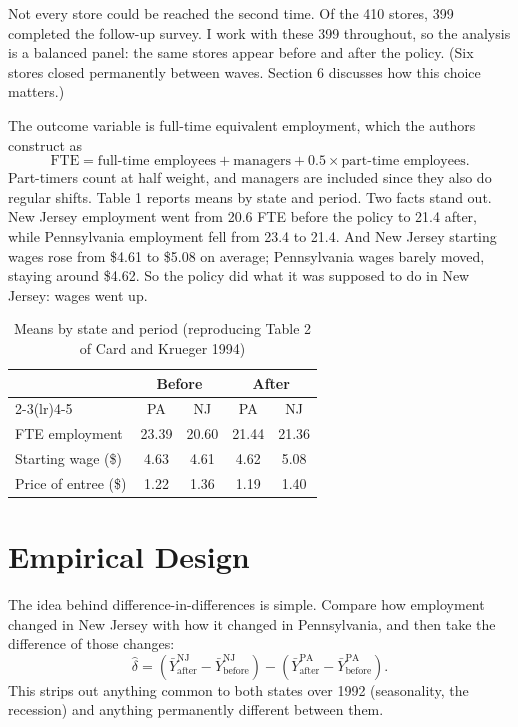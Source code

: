 \documentclass[11pt]{article}
\begin{document}
Not every store could be reached the second time. Of the 410 stores, 399 completed the follow-up survey. I work with these 399 throughout, so the analysis is a balanced panel: the same stores appear before and after the policy. (Six stores closed permanently between waves. Section 6 discusses how this choice matters.)

The outcome variable is full-time equivalent employment, which the authors construct as
\[
\text{FTE} = \text{full-time employees} + \text{managers} + 0.5 \times \text{part-time employees}.
\]
Part-timers count at half weight, and managers are included since they also do regular shifts. Table 1 reports means by state and period. Two facts stand out. New Jersey employment went from 20.6 FTE before the policy to 21.4 after, while Pennsylvania employment fell from 23.4 to 21.4. And New Jersey starting wages rose from \$4.61 to \$5.08 on average; Pennsylvania wages barely moved, staying around \$4.62. So the policy did what it was supposed to do in New Jersey: wages went up.

\begin{table}[h]
\centering
\caption{Means by state and period (reproducing Table 2 of Card and Krueger 1994)}
\begin{tabular}{lcccc}
\toprule
 & \multicolumn{2}{c}{Before} & \multicolumn{2}{c}{After} \\
\cmidrule(lr){2-3}\cmidrule(lr){4-5}
 & PA & NJ & PA & NJ \\
\midrule
FTE employment & 23.39 & 20.60 & 21.44 & 21.36 \\
Starting wage (\$) & 4.63 & 4.61 & 4.62 & 5.08 \\
Price of entree (\$) & 1.22 & 1.36 & 1.19 & 1.40 \\
\bottomrule
\end{tabular}
\end{table}

\section{Empirical Design}

The idea behind difference-in-differences is simple. Compare how employment changed in New Jersey with how it changed in Pennsylvania, and then take the difference of those changes:
\[
\widehat{\delta} = (\bar{Y}^{\text{NJ}}_{\text{after}} - \bar{Y}^{\text{NJ}}_{\text{before}}) - (\bar{Y}^{\text{PA}}_{\text{after}} - \bar{Y}^{\text{PA}}_{\text{before}}).
\]
This strips out anything common to both states over 1992 (seasonality, the recession) and anything permanently different between them.
\end{document}
